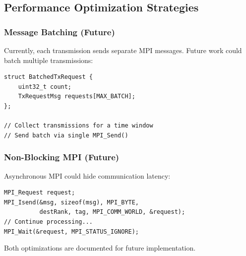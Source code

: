 \subsection{Performance Optimization Strategies}

\subsubsection{Message Batching (Future)}

Currently, each transmission sends separate MPI messages. Future work could batch multiple transmissions:

\begin{lstlisting}[style=cpp, caption={Message batching concept}]
struct BatchedTxRequest {
    uint32_t count;
    TxRequestMsg requests[MAX_BATCH];
};

// Collect transmissions for a time window
// Send batch via single MPI_Send()
\end{lstlisting}

\subsubsection{Non-Blocking MPI (Future)}

Asynchronous MPI could hide communication latency:

\begin{lstlisting}[style=cpp, caption={Non-blocking MPI concept}]
MPI_Request request;
MPI_Isend(&msg, sizeof(msg), MPI_BYTE, 
          destRank, tag, MPI_COMM_WORLD, &request);
// Continue processing...
MPI_Wait(&request, MPI_STATUS_IGNORE);
\end{lstlisting}

Both optimizations are documented for future implementation.

